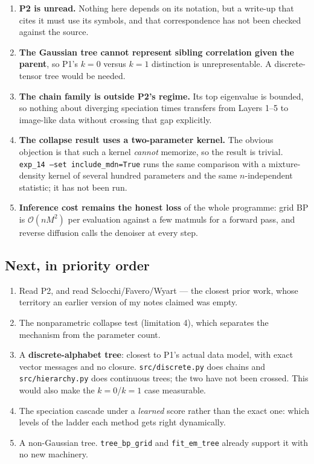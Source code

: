\documentclass[11pt]{article}
\theoremstyle{remark}
\newcommand{\code}[1]{\texttt{\small #1}}
\begin{document}
\begin{enumerate}[nosep]
  \item \textbf{P2 is unread.} Nothing here depends on its notation, but a
    write-up that cites it must use its symbols, and that correspondence has not
    been checked against the source.
  \item \textbf{The Gaussian tree cannot represent sibling correlation given the
    parent}, so P1's $k{=}0$ versus $k{=}1$ distinction is unrepresentable. A
    discrete-tensor tree would be needed.
  \item \textbf{The chain family is outside P2's regime.} Its top eigenvalue is
    bounded, so nothing about diverging speciation times transfers from Layers
    1--5 to image-like data without crossing that gap explicitly.
  \item \textbf{The collapse result uses a two-parameter kernel.} The obvious
    objection is that such a kernel \emph{cannot} memorize, so the result is
    trivial. \code{exp\_14 --set include\_mdn=True} runs the same comparison
    with a mixture-density kernel of several hundred parameters and the same
    $n$-independent statistic; it has not been run.
  \item \textbf{Inference cost remains the honest loss} of the whole programme:
    grid BP is $\mathcal O(nM^2)$ per evaluation against a few matmuls for a
    forward pass, and reverse diffusion calls the denoiser at every step.
\end{enumerate}

\subsection{Next, in priority order}

\begin{enumerate}[nosep]
  \item Read P2, and read Sclocchi/Favero/Wyart --- the closest prior work,
    whose territory an earlier version of my notes claimed was empty.
  \item The nonparametric collapse test (limitation 4), which separates the
    mechanism from the parameter count.
  \item A \textbf{discrete-alphabet tree}: closest to P1's actual data model,
    with exact vector messages and no closure. \code{src/discrete.py} does
    chains and \code{src/hierarchy.py} does continuous trees; the two have not
    been crossed. This would also make the $k{=}0$/$k{=}1$ case measurable.
  \item The speciation cascade under a \emph{learned} score rather than the
    exact one: which levels of the ladder each method gets right dynamically.
  \item A non-Gaussian tree. \code{tree\_bp\_grid} and \code{fit\_em\_tree}
    already support it with no new machinery.
\end{enumerate}
\end{document}
